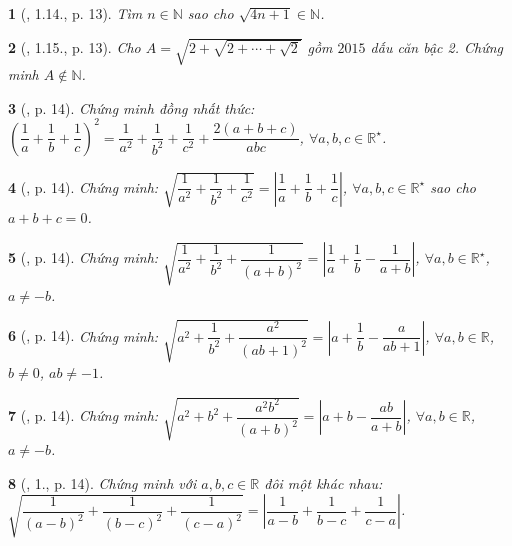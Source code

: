 \documentclass{article}
\newtheorem{baitoan}{}
\begin{document}
\begin{baitoan}[\cite{Binh_boi_duong_Toan_9_tap_1}, 1.14., p. 13]
	Tìm $n\in\mathbb{N}$ sao cho $\sqrt{4n + 1}\in\mathbb{N}$.
\end{baitoan}

\begin{baitoan}[\cite{Binh_boi_duong_Toan_9_tap_1}, 1.15., p. 13]
	Cho $A = \sqrt{2 + \sqrt{2 + \cdots + \sqrt{2}}}$ gồm $2015$ dấu căn bậc 2. Chứng minh $A\notin\mathbb{N}$.
\end{baitoan}

\begin{baitoan}[\cite{Binh_boi_duong_Toan_9_tap_1}, p. 14]
	Chứng minh đồng nhất thức: $\left(\dfrac{1}{a} + \dfrac{1}{b} + \dfrac{1}{c}\right)^2 = \dfrac{1}{a^2} + \dfrac{1}{b^2} + \dfrac{1}{c^2} + \dfrac{2(a + b + c)}{abc}$, $\forall a,b,c\in\mathbb{R}^\star$.
\end{baitoan}

\begin{baitoan}[\cite{Binh_boi_duong_Toan_9_tap_1}, p. 14]
	Chứng minh: $\sqrt{\dfrac{1}{a^2} + \dfrac{1}{b^2} + \dfrac{1}{c^2}} = \left|\dfrac{1}{a} + \dfrac{1}{b} + \dfrac{1}{c}\right|$, $\forall a,b,c\in\mathbb{R}^\star$ sao cho $a + b + c = 0$.
\end{baitoan}

\begin{baitoan}[\cite{Binh_boi_duong_Toan_9_tap_1}, p. 14]
	Chứng minh: $\sqrt{\dfrac{1}{a^2} + \dfrac{1}{b^2} + \dfrac{1}{(a + b)^2}} = \left|\dfrac{1}{a} + \dfrac{1}{b} - \dfrac{1}{a + b}\right|$, $\forall a,b\in\mathbb{R}^\star$, $a\ne-b$.
\end{baitoan}

\begin{baitoan}[\cite{Binh_boi_duong_Toan_9_tap_1}, p. 14]
	Chứng minh: $\sqrt{a^2 + \dfrac{1}{b^2} + \dfrac{a^2}{(ab + 1)^2}} = \left|a + \dfrac{1}{b} - \dfrac{a}{ab + 1}\right|$, $\forall a,b\in\mathbb{R}$, $b\ne0$, $ab\ne-1$.
\end{baitoan}

\begin{baitoan}[\cite{Binh_boi_duong_Toan_9_tap_1}, p. 14]
	Chứng minh: $\sqrt{a^2 + b^2 + \dfrac{a^2b^2}{(a + b)^2}} = \left|a + b - \dfrac{ab}{a + b}\right|$, $\forall a,b\in\mathbb{R}$, $a\ne-b$.
\end{baitoan}

\begin{baitoan}[\cite{Binh_boi_duong_Toan_9_tap_1}, 1., p. 14]
	Chứng minh với $a,b,c\in\mathbb{R}$ đôi một khác nhau: $\sqrt{\dfrac{1}{(a - b)^2} + \dfrac{1}{(b - c)^2} + \dfrac{1}{(c - a)^2}} = \left|\dfrac{1}{a - b} + \dfrac{1}{b - c} + \dfrac{1}{c - a}\right|$.
\end{baitoan}
\end{document}

